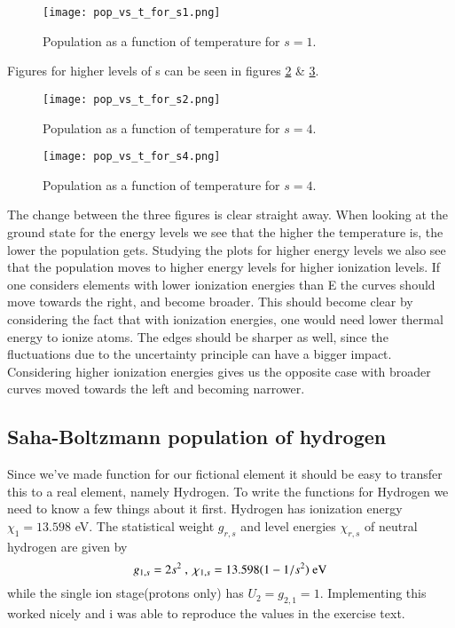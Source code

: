 \documentclass{aa}   %
\begin{document}
\begin{figure}
 \texttt{[image: pop\_vs\_t\_for\_s1.png]}
 \caption{Population as a function of temperature for $s = 1$.}
 \label{pop_vs_t_for_s1}
\end{figure}

Figures for higher levels of s can be seen in figures \ref{pop_vs_t_for_s2} \& \ref{pop_vs_t_for_s4}.
\begin{figure}
 \texttt{[image: pop\_vs\_t\_for\_s2.png]}
 \caption{Population as a function of temperature for $s = 4$.}
 \label{pop_vs_t_for_s2}
\end{figure}

\begin{figure}
 \texttt{[image: pop\_vs\_t\_for\_s4.png]}
 \caption{Population as a function of temperature for $s = 4$.}
 \label{pop_vs_t_for_s4}
\end{figure}

The change between the three figures is clear straight away. When looking at the ground state for the energy levels we see that the higher the temperature is, the lower the population gets. Studying the plots for higher energy levels we also see that the population moves to higher energy levels for higher ionization levels. 
If one considers elements with lower ionization energies than E the curves should move towards the right, and become broader. This should become clear by considering the fact that with ionization energies, one would need lower thermal energy to ionize atoms. The edges should be sharper as well, since the fluctuations due to the uncertainty principle can have a bigger impact.
Considering higher ionization energies gives us the opposite case with broader curves moved towards the left and becoming narrower.

\subsection{Saha-Boltzmann population of hydrogen}
Since we've made function for our fictional element it should be easy to transfer this to a real element, namely Hydrogen.
To write the functions for Hydrogen we need to know a few things about it first. Hydrogen has ionization energy $\chi_1 = 13.598$ eV. The statistical weight $g_{r,s}$ and level energies $\chi_{r,s}$ of neutral hydrogen are given by
\begin{equation*}
g_{1,s} = 2s^2 ~,~ \chi_{1,s} = 13.598(1-1/s^2) ~\textmd{eV}
\end{equation*}
while the single ion stage(protons only) has $U_2 = g_{2,1} = 1$.
Implementing this worked nicely and i was able to reproduce the values in the exercise text.
\end{document}
